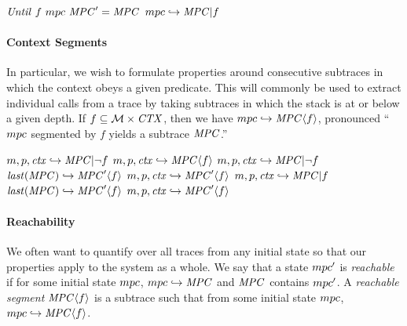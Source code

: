 \documentclass[acmsmall,review,anonymous]{acmart}\settopmatter{printfolios=true,printccs=false,printacmref=false}
\begin{document}
\begin{center}
            {\(\mathit{Until} ~ f ~ mpc ~ \mathit{MPC}' = \mathit{MPC}\)}
            {\(mpc \hookrightarrow \mathit{MPC} | f\)}
\end{center}

\paragraph*{Context Segments}

In particular, we wish to formulate properties around consecutive subtraces
in which the context obeys a given predicate. This will commonly be used to extract
individual calls from a trace by taking subtraces in which the stack is
at or below a given depth. If \(f \subseteq {\mathcal M} \times \mathit{CTX}\), then
we have \(mpc \hookrightarrow \mathit{MPC} \langle f \rangle\), pronounced
``\(mpc\) segmented by \(f\) yields a subtrace \(\mathit{MPC}\).''

\begin{center}
              {\(m,p,\mathit{ctx} \hookrightarrow \mathit{MPC} | \neg f\)}
              {\(m,p,\mathit{ctx} \hookrightarrow \mathit{MPC} \langle f \rangle\)}
%
                {\(m,p,\mathit{ctx} \hookrightarrow \mathit{MPC} | \neg f\)}
                {\(\mathit{last}(\mathit{MPC}) \hookrightarrow \mathit{MPC}' \langle f \rangle\)}
                {\(m,p,\mathit{ctx} \hookrightarrow \mathit{MPC}' \langle f \rangle\)}
%
                {\(m,p,\mathit{ctx} \hookrightarrow \mathit{MPC} | f\)}
                {\(\mathit{last}(\mathit{MPC}) \hookrightarrow \mathit{MPC}' \langle f \rangle\)}
                {\(m,p,\mathit{ctx} \hookrightarrow \mathit{MPC}' \langle f \rangle\)}
\end{center}

\paragraph*{Reachability}

We often want to quantify over all traces from any initial state so that our
properties apply to the system as a whole. We say that a state \(mpc'\)
is {\em reachable} if for some initial state \(mpc\), \(mpc \hookrightarrow \mathit{MPC}\)
and \(\mathit{MPC}\) contains \(mpc'\). A {\it reachable segment} \(\mathit{MPC} \langle f \rangle\) is a subtrace
such that from some initial state \(mpc\), \(mpc \hookrightarrow \mathit{MPC} \langle f \rangle\).
\end{document}
